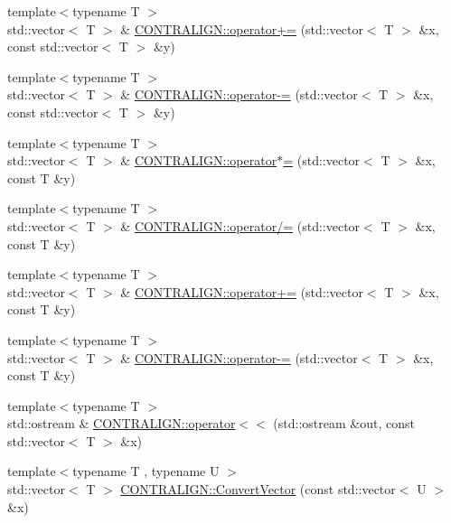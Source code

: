 \begin{DoxyCompactItemize}
\item 
{\footnotesize template$<$typename T $>$ }\\std\+::vector$<$ T $>$ \& \hyperlink{namespace_c_o_n_t_r_a_l_i_g_n_ad2bf01877959caf081dbde8bac578f3f}{C\+O\+N\+T\+R\+A\+L\+I\+G\+N\+::operator+=} (std\+::vector$<$ T $>$ \&x, const std\+::vector$<$ T $>$ \&y)
\item 
{\footnotesize template$<$typename T $>$ }\\std\+::vector$<$ T $>$ \& \hyperlink{namespace_c_o_n_t_r_a_l_i_g_n_af0e8c5f8fbce7e6a51b426e6ac663b30}{C\+O\+N\+T\+R\+A\+L\+I\+G\+N\+::operator-\/=} (std\+::vector$<$ T $>$ \&x, const std\+::vector$<$ T $>$ \&y)
\item 
{\footnotesize template$<$typename T $>$ }\\std\+::vector$<$ T $>$ \& \hyperlink{namespace_c_o_n_t_r_a_l_i_g_n_a4da5ff7c4e30e9e3ac87eeecc67fb638}{C\+O\+N\+T\+R\+A\+L\+I\+G\+N\+::operator$\ast$=} (std\+::vector$<$ T $>$ \&x, const T \&y)
\item 
{\footnotesize template$<$typename T $>$ }\\std\+::vector$<$ T $>$ \& \hyperlink{namespace_c_o_n_t_r_a_l_i_g_n_a821d8b72ad691f1e5b42ffe21b0c05d8}{C\+O\+N\+T\+R\+A\+L\+I\+G\+N\+::operator/=} (std\+::vector$<$ T $>$ \&x, const T \&y)
\item 
{\footnotesize template$<$typename T $>$ }\\std\+::vector$<$ T $>$ \& \hyperlink{namespace_c_o_n_t_r_a_l_i_g_n_a9a01fa9073f79bc1871fd38aedeb8ac3}{C\+O\+N\+T\+R\+A\+L\+I\+G\+N\+::operator+=} (std\+::vector$<$ T $>$ \&x, const T \&y)
\item 
{\footnotesize template$<$typename T $>$ }\\std\+::vector$<$ T $>$ \& \hyperlink{namespace_c_o_n_t_r_a_l_i_g_n_a47ed1e3a7df88433ef471e9ae68d8cdf}{C\+O\+N\+T\+R\+A\+L\+I\+G\+N\+::operator-\/=} (std\+::vector$<$ T $>$ \&x, const T \&y)
\item 
{\footnotesize template$<$typename T $>$ }\\std\+::ostream \& \hyperlink{namespace_c_o_n_t_r_a_l_i_g_n_a837e827bff6e65e98e8c1cc9c2a34d28}{C\+O\+N\+T\+R\+A\+L\+I\+G\+N\+::operator$<$$<$} (std\+::ostream \&out, const std\+::vector$<$ T $>$ \&x)
\item 
{\footnotesize template$<$typename T , typename U $>$ }\\std\+::vector$<$ T $>$ \hyperlink{namespace_c_o_n_t_r_a_l_i_g_n_a7482cc725c843303831d85acb4807163}{C\+O\+N\+T\+R\+A\+L\+I\+G\+N\+::\+Convert\+Vector} (const std\+::vector$<$ U $>$ \&x)

\end{DoxyCompactItemize}
